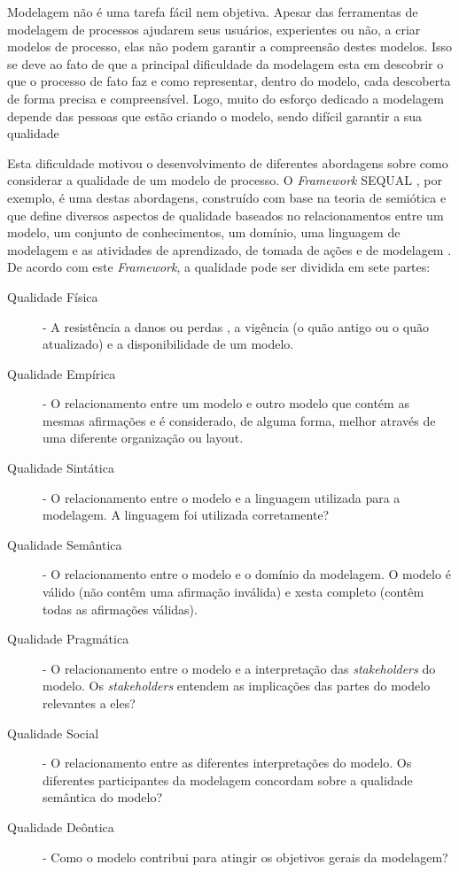 \documentclass[12pt]{article}
\begin{document}
Modelagem não é uma tarefa fácil nem objetiva. Apesar das ferramentas de modelagem de processos ajudarem seus usuários, experientes ou não, a criar modelos de processo, elas não podem garantir a compreensão destes modelos. Isso se deve ao fato de que a principal dificuldade da modelagem esta em descobrir o que o processo de fato faz e como representar, dentro do modelo, cada descoberta de forma precisa e compreensível. Logo, muito do esforço dedicado a modelagem depende das pessoas que estão criando o modelo, sendo difícil garantir a sua qualidade \cite{Mendling2010a}

Esta dificuldade motivou o desenvolvimento de diferentes abordagens sobre como considerar a qualidade de um modelo de processo. O \textit{Framework} SEQUAL \cite{Krogstie2006,Lindland1994}, por exemplo, é uma destas abordagens, construído com base na teoria de semiótica e que define diversos aspectos de qualidade baseados no relacionamentos entre um modelo, um conjunto de conhecimentos, um domínio, uma linguagem de modelagem e as atividades de aprendizado, de tomada de ações e de modelagem \cite{Mendling2007}. De acordo com este \textit{Framework}, a qualidade pode ser dividida em sete partes:

\begin{description}
	\item [Qualidade Física] - A resistência a danos ou perdas , a vigência (o quão antigo ou o quão atualizado) e a disponibilidade de um modelo.
	\item [Qualidade Empírica] - O relacionamento entre um modelo e outro modelo que contém as mesmas afirmações e é considerado, de alguma forma, melhor através de uma diferente organização ou layout.
	\item [Qualidade Sintática] - O relacionamento entre o modelo e a linguagem utilizada para a modelagem. A linguagem foi utilizada corretamente?
	\item [Qualidade Semântica] - O relacionamento entre o modelo e o domínio da modelagem. O modelo é válido (não contêm uma afirmação inválida) e xesta completo (contêm todas as afirmações válidas).
	\item [Qualidade Pragmática] - O relacionamento entre o modelo e a interpretação das \textit{stakeholders} do modelo. Os \textit{stakeholders} entendem as implicações das partes do modelo relevantes a eles?
	\item [Qualidade Social] - O relacionamento entre as diferentes interpretações do modelo. Os diferentes participantes da modelagem concordam sobre a qualidade semântica do modelo?
	\item [Qualidade Deôntica] - Como o modelo contribui para atingir os objetivos gerais da modelagem?
\end{description}
\end{document}
